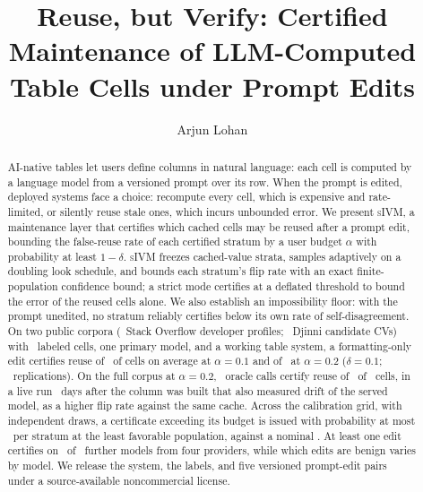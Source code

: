 \documentclass[sigconf, nonacm]{acmart}
\theoremstyle{acmdefinition}
\newcommand{\sivm}{\textsc{sIVM}}
\begin{document}
\title{Reuse, but Verify: Certified Maintenance of LLM-Computed Table
Cells under Prompt Edits}

\author{Arjun Lohan}

\begin{abstract}
AI-native tables let users define columns in natural language: each cell
is computed by a language model from a versioned prompt over its row.
When the prompt is edited, deployed systems face a choice:
recompute every cell, which is expensive and rate-limited, or silently
reuse stale ones, which incurs unbounded error. We present \sivm{}, a
maintenance layer that certifies which cached cells may be reused after
a prompt edit, bounding the false-reuse rate of each certified stratum
by a user budget $\alpha$ with probability at least $1-\delta$.
\sivm{} freezes cached-value strata, samples adaptively on a doubling
look schedule, and bounds each stratum's flip rate with an exact
finite-population confidence bound; a strict mode certifies at a
deflated threshold to bound the error of the reused cells alone. We
also establish an impossibility floor: with the prompt unedited, no
stratum reliably certifies below its own rate of self-disagreement. On two
public corpora (\corpusSO\ Stack Overflow developer profiles;
\corpusDjinni\ Djinni candidate CVs) with \ labeled cells,
one primary model, and a working table system, a formatting-only edit certifies
reuse of \frontierB\ of cells on average at $\alpha{=}0.1$ and of
\benchSavings\ at $\alpha{=}0.2$ ($\delta{=}0.1$; \bootB\
replications). On the full corpus at $\alpha{=}0.2$,
\deployOracle\ oracle calls certify reuse of \deployReused\ of
\deployN\ cells, in a live run \driftDaysLater\ days after the column
was built that also measured drift of the served model, as a higher
flip rate against the same cache. Across
the calibration grid, with independent draws, a certificate exceeding
its budget is issued with probability at most \calBoundaryHi\ per
stratum at the least favorable population, against a nominal
\calNominalDelta. At least one edit certifies
on \famCertCount\ of \famCount\ further models from four providers, while
which edits are benign varies by model. We release the system, the
labels, and five versioned prompt-edit pairs under a
source-available noncommercial license.
\end{abstract}
\end{document}
